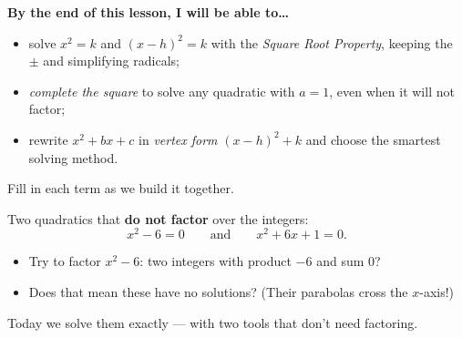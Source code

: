 \documentclass[10pt]{article}
\begin{document}

\vspace{0.10in}

\begin{objectivebox}
\textbf{By the end of this lesson, I will be able to\dots}
\begin{itemize}\setlength{\itemsep}{2pt}
  \item solve $x^2=k$ and $(x-h)^2=k$ with the \emph{Square Root Property}, keeping the $\pm$ and simplifying radicals;
  \item \emph{complete the square} to solve any quadratic with $a=1$, even when it will not factor;
  \item rewrite $x^2+bx+c$ in \emph{vertex form} $(x-h)^2+k$ and choose the smartest solving method.
\end{itemize}
\end{objectivebox}

\vspace{0.06in}

\begin{vocabbox}
\small
Fill in each term as we build it together.
\par\vspace{2pt}
\end{vocabbox}

\begin{hookbox}
Two quadratics that \textbf{do not factor} over the integers:
\[ x^2-6=0 \qquad\text{and}\qquad x^2+6x+1=0. \]
\begin{itemize}\setlength{\itemsep}{1pt}
  \item Try to factor $x^2-6$: two integers with product $-6$ and sum $0$? \writeline
  \item Does that mean these have no solutions? (Their parabolas cross the $x$-axis!) \writeline
\end{itemize}
Today we solve them exactly --- with two tools that don't need factoring.
\end{hookbox}
\end{document}
